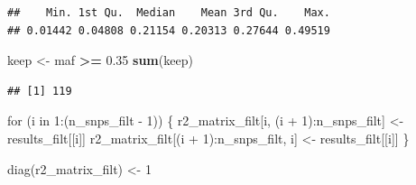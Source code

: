 \documentclass[
]{article}
\newenvironment{Shaded}{\begin{snugshade}}{\end{snugshade}}
\newcommand{\AttributeTok}[1]{\textcolor[rgb]{0.13,0.29,0.53}{#1}}
\newcommand{\ConstantTok}[1]{\textcolor[rgb]{0.56,0.35,0.01}{#1}}
\newcommand{\ControlFlowTok}[1]{\textcolor[rgb]{0.13,0.29,0.53}{\textbf{#1}}}
\newcommand{\DecValTok}[1]{\textcolor[rgb]{0.00,0.00,0.81}{#1}}
\newcommand{\FloatTok}[1]{\textcolor[rgb]{0.00,0.00,0.81}{#1}}
\newcommand{\FunctionTok}[1]{\textcolor[rgb]{0.13,0.29,0.53}{\textbf{#1}}}
\newcommand{\NormalTok}[1]{#1}
\newcommand{\OtherTok}[1]{\textcolor[rgb]{0.56,0.35,0.01}{#1}}
\newcommand{\SpecialCharTok}[1]{\textcolor[rgb]{0.81,0.36,0.00}{\textbf{#1}}}
\newcommand{\StringTok}[1]{\textcolor[rgb]{0.31,0.60,0.02}{#1}}
\begin{document}
\begin{verbatim}
##    Min. 1st Qu.  Median    Mean 3rd Qu.    Max. 
## 0.01442 0.04808 0.21154 0.20313 0.27644 0.49519
\end{verbatim}

\begin{Shaded}
\begin{Highlighting}[]
\NormalTok{keep }\OtherTok{\textless{}{-}}\NormalTok{ maf }\SpecialCharTok{\textgreater{}=} \FloatTok{0.35}
\FunctionTok{sum}\NormalTok{(keep) }
\end{Highlighting}
\end{Shaded}

\begin{verbatim}
## [1] 119
\end{verbatim}

\begin{Shaded}
\end{Shaded}

for (i in 1:(n\_snps\_filt - 1)) \{ r2\_matrix\_filt{[}i, (i +
1):n\_snps\_filt{]} \textless- results\_filt{[}{[}i{]}{]}
r2\_matrix\_filt{[}(i + 1):n\_snps\_filt, i{]} \textless-
results\_filt{[}{[}i{]}{]} \}

diag(r2\_matrix\_filt) \textless- 1
\end{document}
